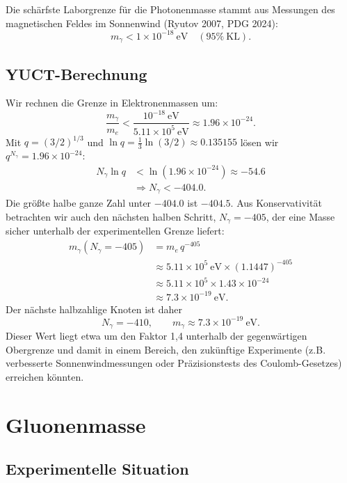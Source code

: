 \documentclass[12pt,a4paper]{article}
\begin{document}
	Die schärfste Laborgrenze für die Photonenmasse stammt aus Messungen des magnetischen Feldes im Sonnenwind
	(Ryutov 2007, PDG 2024):
	\begin{equation}\label{eq:photonlimit}
		m_\gamma < 1 \times 10^{-18}~\mathrm{eV} \quad (95\%~\mathrm{KL}).
	\end{equation}
	
	\subsection{YUCT-Berechnung}
	
	Wir rechnen die Grenze in Elektronenmassen um:
	\[
	\frac{m_\gamma}{m_e} < \frac{10^{-18}~\mathrm{eV}}{5.11\times 10^5~\mathrm{eV}}
	\approx 1.96 \times 10^{-24}.
	\]
	Mit $q = (3/2)^{1/3}$ und $\ln q = \tfrac13\ln(3/2) \approx 0.135155$ lösen wir
	$q^{N_\gamma} = 1.96\times10^{-24}$:
	\[
	\begin{aligned}
		N_\gamma \ln q &< \ln(1.96\times10^{-24}) \approx -54.6 \\
		&\Longrightarrow N_\gamma < -404.0 .
	\end{aligned}
	\]
	Die größte halbe ganze Zahl unter $-404.0$ ist $-404.5$. Aus Konservativität betrachten wir auch den nächsten
	halben Schritt, $N_\gamma = -405$, der eine Masse sicher unterhalb der experimentellen Grenze liefert:
	\[
	\begin{aligned}
		m_\gamma(N_\gamma = -405) &= m_e \, q^{-405} \\
		&\approx 5.11\times10^5~\mathrm{eV} \times (1.1447)^{-405} \\
		&\approx 5.11\times10^5 \times 1.43\times10^{-24} \\
		&\approx 7.3 \times 10^{-19}~\mathrm{eV}.
	\end{aligned}
	\]
	Der nächste halbzahlige Knoten ist daher
	\[
	\boxed{N_\gamma = -410}, \qquad
	\boxed{m_\gamma \approx 7.3 \times 10^{-19}~\mathrm{eV}} .
	\]
	Dieser Wert liegt etwa um den Faktor 1,4 unterhalb der gegenwärtigen Obergrenze und damit in einem Bereich,
	den zukünftige Experimente (z.B. verbesserte Sonnenwindmessungen oder Präzisionstests des Coulomb-Gesetzes)
	erreichen könnten.
	
	\section{Gluonenmasse}
	
	\subsection{Experimentelle Situation}
	
\end{document}
